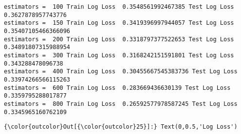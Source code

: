 \documentclass[11pt]{article}
\begin{document}
    \begin{Verbatim}[commandchars=\\\{\}]
estimators =  100 Train Log Loss  0.3548561992467385 Test Log Loss  0.3627878957743776
estimators =  150 Train Log Loss  0.3419396997944057 Test Log Loss  0.35407105466366096
estimators =  200 Train Log Loss  0.3318797377522653 Test Log Loss  0.34891807315988954
estimators =  300 Train Log Loss  0.3168242151591801 Test Log Loss  0.343288478096738
estimators =  400 Train Log Loss  0.30455667545383736 Test Log Loss  0.33974266566115263
estimators =  600 Train Log Loss  0.283669436630139 Test Log Loss  0.3359795288017877
estimators =  800 Train Log Loss  0.26592577978587245 Test Log Loss  0.3345965160762109

    \end{Verbatim}

\begin{Verbatim}[commandchars=\\\{\}]
{\color{outcolor}Out[{\color{outcolor}25}]:} Text(0,0.5,'Log Loss')
\end{Verbatim}
            
    \begin{center}
    \end{center}
    { \hspace*{\fill} \\}
    
\end{document}
